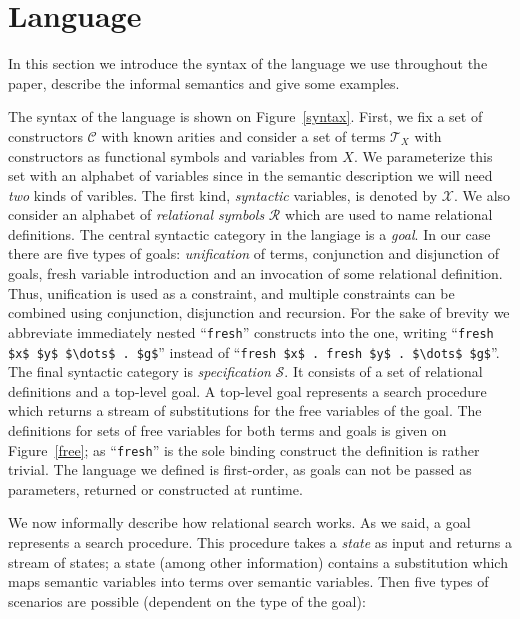 \section{Language}

In this section we introduce the syntax of the language we use throughout the paper, describe the informal semantics and give some examples.

The syntax of the language is shown on Figure~\ref{syntax}. First, we fix a set of constructors $\mathcal{C}$ with known arities and consider
a set of terms $\mathcal{T}_X$ with constructors as functional symbols and variables from $X$. We parameterize this set with an alphabet of
variables since in the semantic description we will need \emph{two} kinds of varibles. The first kind, \emph{syntactic} variables, is denoted
by $\mathcal{X}$. We also consider an alphabet of \emph{relational symbols} $\mathcal{R}$ which are used to name relational definitions.
The central syntactic category in the langiage is a \emph{goal}. In our case there are five types of goals: \emph{unification} of terms,
conjunction and disjunction of goals, fresh variable introduction and an invocation of some relational definition. Thus, unification is used
as a constraint, and multiple constraints can be combined using conjunction, disjunction and recursion. For the sake of brevity we
abbreviate immediately nested ``\lstinline|fresh|'' constructs into the one, writing ``\lstinline|fresh $x$ $y$ $\dots$ . $g$|'' instead of
``\lstinline|fresh $x$ . fresh $y$ . $\dots$ $g$|''. The final syntactic category is \emph{specification} $\mathcal{S}$. It consists of a set
of relational definitions and a top-level goal. A top-level goal represents a search procedure which returns a stream of substitutions for
the free variables of the goal. The definitions for sets of free variables for both terms and goals is given on Figure~\ref{free}; as ``\lstinline|fresh|''
is the sole binding construct the definition is rather trivial. The language we defined is first-order, as goals can not be passed as parameters,
returned or constructed at runtime.

We now informally describe how relational search works. As we said, a goal represents a search procedure. This procedure takes a \emph{state} as input and returns a
stream of states; a state (among other information) contains a substitution which maps semantic variables into terms over semantic variables. Then five types of
scenarios are possible (dependent on the type of the goal):

